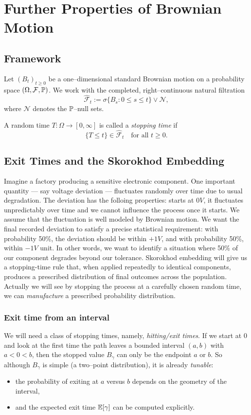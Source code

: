 \chapter{Further Properties of Brownian Motion}

\section{Framework}

Let $(B_t)_{t\ge0}$ be a one--dimensional standard Brownian motion on a probability space
$(\Omega,\mathcal F,\mathbb{P})$.
We work with the completed, right--continuous natural filtration
\[
\widehat{\mathcal F}_t
:= \sigma\{B_s:0\le s\le t\}\vee\mathcal N,
\]
where $\mathcal N$ denotes the $\mathbb{P}$--null sets.

A random time $T:\Omega\to[0,\infty]$ is called a \emph{stopping time} if
\[
\{T\le t\}\in\widehat{\mathcal F}_t
\quad\text{for all }t\ge0.
\]

\section{Exit Times and the Skorokhod Embedding}

Imagine a factory producing a sensitive electronic component. One important quantity — say voltage deviation — fluctuates randomly over time due to usual degradation. The deviation has the folloing properties: starts at $0V$, it fluctuates unpredictably over time and we cannot influence the process once it starts. We assume that the fluctuation is well modeled by Brownian motion. We want the final recorded deviation to satisfy a precise statistical requirement: with probability 50\%, the deviation should be within $+1V$,
and with probability 50\%, within $-1V$ unit. In other words, we want to identify a situation where 50\% of our component degrades beyond our tolerance. Skorokhod embedding will give us a stopping-time rule that, when applied repeatedly to identical components, produces a prescribed distribution of final outcomes across the population. Actually we will see by stopping the process at a carefully chosen random time, we can \emph{manufacture} a prescribed probability distribution.


\subsection{Exit time from an interval}
We will need a class of stopping times, namely, \emph{hitting/exit times}.
If we start at $0$ and look at the first time the path leaves a bounded interval $(a,b)$ with $a<0<b$,
then the stopped value $B_\gamma$ can only be the endpoint $a$ or $b$.
So although $B_\gamma$ is simple (a two--point distribution), it is already \emph{tunable}:
\begin{itemize}
\item the probability of exiting at $a$ versus $b$ depends on the geometry of the interval,
\item and the expected exit time $\mathbb{E}[\gamma]$ can be computed explicitly.
\end{itemize}

